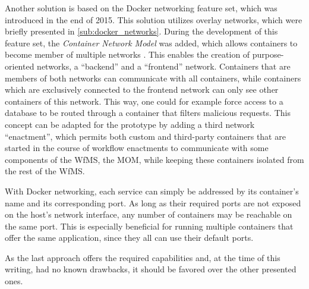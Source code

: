   Another solution is based on the Docker networking feature set, which was introduced in the end of 2015.
  This solution utilizes overlay networks, which were briefly presented in \ref{sub:docker_networks}. During the development of this feature set, the \emph{Container Network Model} was added, which allows containers to become member of multiple networks \cite{Tucker2015Docker}.
  This enables the creation of purpose-oriented networks, \eg a ``backend'' and a ``frontend'' network. Containers that are members of both networks can communicate with all containers, while containers which are exclusively connected to the frontend network can only see other containers of this network. This way, one could for example force access to a database to be routed through a container that filters malicious requests. This concept can be adapted for the prototype by adding a third network ``enactment'', which permits both custom and third-party containers that are started in the course of workflow enactments to communicate with some components of the \ac{WfMS}, \eg the \ac{MOM}, while keeping these containers isolated from the rest of the \ac{WfMS}.

  With Docker networking, each service can simply be addressed by its container's name and its corresponding port. As long as their required ports are not exposed on the host's network interface, any number of containers may be reachable on the same port. This is especially beneficial for running multiple containers that offer the same application, since they all can use their default ports.

  As the last approach offers the required capabilities and, at the time of this writing, had no known drawbacks, it should be favored over the other presented ones.
